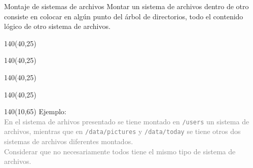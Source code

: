 \documentclass[aspectratio=169]{beamer}
\begin{document}
\begin{frame}[fragile,t]{Montaje de sistemas de archivos}
    Montar un sistema de archivos dentro de otro consiste en colocar en algún punto del árbol de directorios, todo el contenido lógico de otro sistema de archivos.
    \begin{textblock}{140}(40,25)  \end{textblock}
    \begin{textblock}{140}(40,25)  \end{textblock}
    \begin{textblock}{140}(40,25)  \end{textblock}
    \begin{textblock}{140}(40,25)  \end{textblock}
    \begin{textblock}{140}(10,65)
    Ejemplo:\\ \small
    \textcolor{gray}{En el sistema de arhivos presentado se tiene montado en \texttt{/users} un sistema de archivos, 
    mientras que en \texttt{/data/pictures} y \texttt{/data/today} se tiene otros dos sistemas de archivos diferentes montados.\\
    Considerar que no necesariamente todos tiene el mismo tipo de sistema de archivos.}\\
    \end{textblock}
\end{frame}


\end{document}
